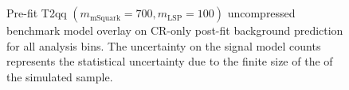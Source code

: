 \begin{figure}[h!]
\begin{center}
{            \label{fig:T2qq_1fold_uncompressed_MR_4j}
        } \\
         ~~
         \\
        \caption{
            Pre-fit T2qq $(m_{\mathrm{mSquark}}=700, m_{\mathrm{LSP}}=100)$
            uncompressed benchmark model overlay on CR-only post-fit background
            prediction for all analysis bins. The uncertainty on the signal
            model counts represents the statistical uncertainty due to the
            finite size of the of the simulated sample.
        }
        \label{fig:T2qq_1fold_uncompressed_MR}
    \end{center}
\end{figure}

